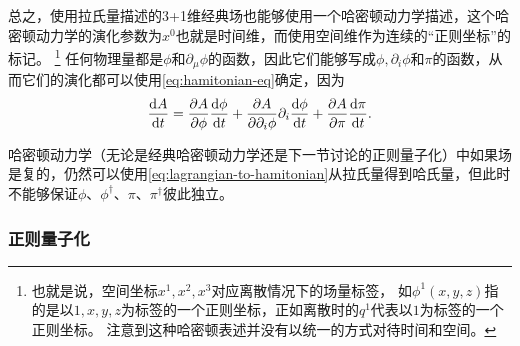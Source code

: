 \documentclass[UTF8, a4paper]{ctexart}
\begin{document}
总之，使用拉氏量描述的3+1维经典场也能够使用一个哈密顿动力学描述，这个哈密顿动力学的演化参数为$x^0$也就是时间维，而使用空间维作为连续的“正则坐标”的标记。%
\footnote{也就是说，空间坐标$x^1, x^2, x^3$对应离散情况下的场量标签，
如$\phi^1(x, y, z)$指的是以$1, x, y, z$为标签的一个正则坐标，正如离散时的$q^{1}$代表以$1$为标签的一个正则坐标。
注意到这种哈密顿表述并没有以统一的方式对待时间和空间。\label{note:spacial-label}}%
任何物理量都是$\phi$和$\partial_\mu \phi$的函数，因此它们能够写成$\phi, \partial_i \phi$和$\pi$的函数，从而它们的演化都可以使用\eqref{eq:hamitonian-eq}确定，因为
\begin{equation}
    \dv{A}{t} = \pdv{A}{\phi} \dv{\phi}{t} + \pdv{A}{\partial_i \phi} \partial_i \dv{\phi}{t} + \pdv{A}{\pi} \dv{\pi}{t}.
    \label{eq:evolution-of-any-quantity}
\end{equation}

哈密顿动力学（无论是经典哈密顿动力学还是下一节讨论的正则量子化）中如果场是复的，仍然可以使用\eqref{eq:lagrangian-to-hamitonian}从拉氏量得到哈氏量，但此时不能够保证$\phi$、$\phi^\dagger$、$\pi$、$\pi^\dagger$彼此独立。

\subsubsection{正则量子化}\label{sec:canonical-quantization}
\end{document}
